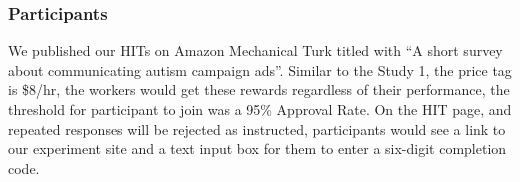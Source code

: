 \subsubsection{Participants}
We published our HITs on Amazon Mechanical Turk titled with ``A short survey about communicating autism campaign ads''. Similar to the Study 1, the price tag is \$8/hr, the workers would get these rewards regardless of their performance, the threshold for participant to join was a 95\% Approval Rate. On the HIT page, and repeated responses will be rejected as instructed, participants would see a link to our experiment site and a text input box for them to enter a six-digit completion code.
